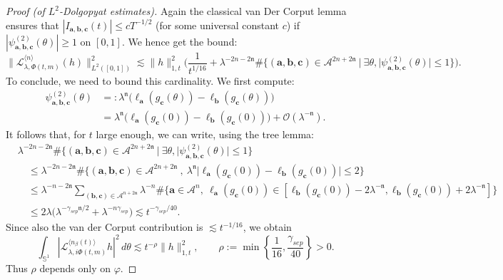 \documentclass[10pt,a4paper]{amsart}
\begin{document}
\begin{proof}[Proof (of $L^2$-Dolgopyat estimates)]
Again the classical van Der Corput lemma ensures that $|I_{\mathbf{a},\mathbf{b},\mathbf{c}}(t)| \leq c T^{-1/2}$ (for some universal constant $c$) if $|\psi_{\mathbf{a},\mathbf{b},\mathbf{c}}^{(2)}(\theta)| \geq 1$ on $[0,1]$. We hence get the bound:
$$ \Big\| \mathcal{L}_{\lambda,\Phi(t,m)}^{\langle n \rangle}(h) \Big\|_{L^2([0,1])}^2 \lesssim \|h\|_{1,t}^2 \Big( \frac{1}{t^{1/16}} + \lambda^{-2n-2\mathfrak{n}} \#\{ (\mathbf{a},\mathbf{b},\mathbf{c}) \in \mathcal{A}^{2n+2\mathfrak{n}} \ | \ \exists \theta, |\psi_{\mathbf{a},\mathbf{b},\mathbf{c}}^{(2)}(\theta)| \leq 1\} \Big). $$
To conclude, we need to bound this cardinality. We first compute:
\begin{align*}
\psi_{\mathbf{a},\mathbf{b},\mathbf{c}}^{(2)}(\theta) &=: \lambda^{\mathfrak{n}} \big( \ell_{\mathbf{a}}(g_\mathbf{c}(\theta)) - \ell_{\mathbf{b}}(g_\mathbf{c}(\theta)) \big)  \\
& = \lambda^{\mathfrak{n}} \big( \ell_{\mathbf{a}}(g_\mathbf{c}(0)) - \ell_{\mathbf{b}}(g_\mathbf{c}(0)) \big) + \mathcal{O}(\lambda^{-\mathfrak{n}}) .
\end{align*}
It follows that, for $t$ large enough, we can write, using the tree lemma:
\begin{align*}
& \lambda^{-2n-2\mathfrak{n}} \#\{ (\mathbf{a},\mathbf{b},\mathbf{c}) \in \mathcal{A}^{2n+2\mathfrak{n}} \ | \ \exists \theta, |\psi_{\mathbf{a},\mathbf{b},\mathbf{c}}^{(2)}(\theta)| \leq 1\}\\
&\quad \leq \lambda^{-2n-2\mathfrak{n}} \#\{ (\mathbf{a},\mathbf{b},\mathbf{c}) \in \mathcal{A}^{2n+2\mathfrak{n}} \ , \ \lambda^{\mathfrak{n}} \big| \ell_{\mathbf{a}}(g_\mathbf{c}(0)) - \ell_{\mathbf{b}}(g_\mathbf{c}(0)) \big| \leq 2\} \\
&\quad \leq \lambda^{-n-2\mathfrak{n}} \sum_{(\mathbf{b},\mathbf{c}) \in \mathcal{A}^{n+2\mathfrak{n}}} \lambda^{-n} \#\{ \mathbf{a} \in \mathcal{A}^n, \ \ell_\mathbf{a}(g_\mathbf{c}(0)) \in [\ell_\mathbf{b}(g_\mathbf{c}(0))-2\lambda^{-\mathfrak{n}},\ell_\mathbf{b}(g_\mathbf{c}(0))+2\lambda^{-\mathfrak{n}} ] \} \\
&\quad \leq 2 \lambda \Big( \lambda^{- \gamma_{sep} \mathfrak{n}/2} + \lambda^{-n \gamma_{sep}} \Big) \lesssim t^{-\gamma_{sep}/40}.
\end{align*}
Since also the van der Corput contribution is $\lesssim t^{-1/16}$, we obtain
$$
\int_{\mathbb S^1}
\left|\mathcal L_{\lambda,i\Phi(t,m)}^{\langle n_\beta(t)\rangle}h\right|^2\,d\theta
\lesssim
t^{-\rho}\|h\|_{1,t}^2,
\qquad
\rho:=\min\left\{\frac1{16},\frac{\gamma_{sep}}{40}\right\}>0.
$$
Thus $\rho$ depends only on $\varphi$.
\end{proof}
\end{document}
